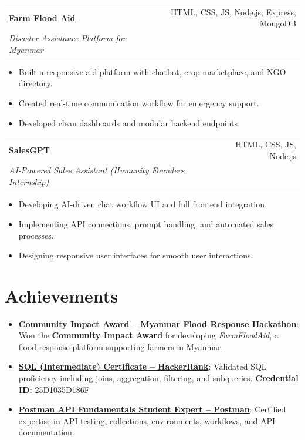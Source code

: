 \documentclass[a4paper,20pt]{article}
\makeatletter
\newcommand{\resumeItem}[2]{
  \item\small{
    \textbf{#1}{: #2 \vspace{-2pt}}
  }
}
\newcommand{\resumeSubheading}[4]{
  \vspace{-1pt}\item
    \begin{tabular*}{0.97\textwidth}{l@{\extracolsep{\fill}}r}
      \textbf{#1} & #2 \\
      \textit{#3} & \textit{#4} \\
    \end{tabular*}\vspace{-5pt}
}
\newcommand{\resumeSubItem}[2]{\resumeItem{#1}{#2}\vspace{-3pt}}
\newcommand{\resumeSubHeadingListStart}{\begin{itemize}[leftmargin=*]}
\newcommand{\resumeSubHeadingListEnd}{\end{itemize}}
\newcommand{\resumeItemListStart}{\begin{itemize}}
\newcommand{\resumeItemListEnd}{\end{itemize}\vspace{-5pt}}
\makeatother
\begin{document}
\resumeSubheading
{\href{https://floodmanagement.onrender.com}{Farm Flood Aid}}{HTML, CSS, JS, Node.js, Express, MongoDB}
{Disaster Assistance Platform for Myanmar}{}
\resumeItemListStart
    \item Built a responsive aid platform with chatbot, crop marketplace, and NGO directory.
    \item Created real-time communication workflow for emergency support.
    \item Developed clean dashboards and modular backend endpoints.
\resumeItemListEnd

\resumeSubheading
{SalesGPT}{HTML, CSS, JS, Node.js}
{AI-Powered Sales Assistant (Humanity Founders Internship)}{}
\resumeItemListStart
    \item Developing AI-driven chat workflow UI and full frontend integration.
    \item Implementing API connections, prompt handling, and automated sales processes.
    \item Designing responsive user interfaces for smooth user interactions.
\resumeItemListEnd


\section{Achievements}
\resumeSubHeadingListStart

\resumeSubItem{\href{https://buildmyanmar.org/hackathon/}{Community Impact Award – Myanmar Flood Response Hackathon}}%
{Won the \textbf{Community Impact Award} for developing \textit{FarmFloodAid}, a flood-response platform supporting farmers in Myanmar.}

\vspace{2pt}

\resumeSubItem{\href{https://www.hackerrank.com/certificates/25d1035d186f}{SQL (Intermediate) Certificate – HackerRank}}%
{Validated SQL proficiency including joins, aggregation, filtering, and subqueries.  
\textbf{Credential ID:} 25D1035D186F}

\vspace{2pt}

\resumeSubItem{\href{https://badges.parchment.com/backpack/badges/66c638f0fdabe85abf65a968?navigationSource=backpack}{Postman API Fundamentals Student Expert – Postman}}%
{Certified expertise in API testing, collections, environments, workflows, and API documentation.}

\vspace{2pt}
\resumeSubHeadingListEnd
\end{document}
